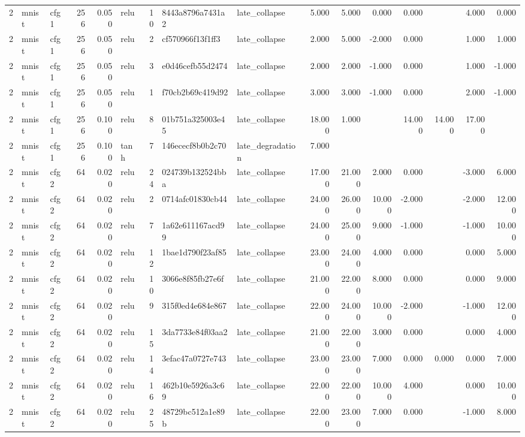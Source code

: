\begin{table}[htbp]
{\begin{tabular}{@{}rllrrlrllrrrrrrr@{}}
2 & mnist & cfg1 & 256 & 0.050 & relu & 10 & 8443a8796a7431a2 & late\_collapse & 5.000 & 5.000 & 0.000 & 0.000 &  & 4.000 & 0.000 \\
2 & mnist & cfg1 & 256 & 0.050 & relu & 2 & cf570966f13f1ff3 & late\_collapse & 2.000 & 5.000 & -2.000 & 0.000 &  & 1.000 & 1.000 \\
2 & mnist & cfg1 & 256 & 0.050 & relu & 3 & e0d46cefb55d2474 & late\_collapse & 2.000 & 2.000 & -1.000 & 0.000 &  & 1.000 & -1.000 \\
2 & mnist & cfg1 & 256 & 0.050 & relu & 1 & f70cb2b69c419d92 & late\_collapse & 3.000 & 3.000 & -1.000 & 0.000 &  & 2.000 & -1.000 \\
2 & mnist & cfg1 & 256 & 0.100 & relu & 8 & 01b751a325003e45 & late\_collapse & 18.000 & 1.000 &  & 14.000 & 14.000 & 17.000 &  \\
2 & mnist & cfg1 & 256 & 0.100 & tanh & 7 & 146ececf8b0b2c70 & late\_degradation & 7.000 &  &  &  &  &  &  \\
2 & mnist & cfg2 & 64 & 0.020 & relu & 24 & 024739b132524bba & late\_collapse & 17.000 & 21.000 & 2.000 & 0.000 &  & -3.000 & 6.000 \\
2 & mnist & cfg2 & 64 & 0.020 & relu & 2 & 0714afc01830cb44 & late\_collapse & 24.000 & 26.000 & 10.000 & -2.000 &  & -2.000 & 12.000 \\
2 & mnist & cfg2 & 64 & 0.020 & relu & 7 & 1a62e611167acd99 & late\_collapse & 24.000 & 25.000 & 9.000 & -1.000 &  & -1.000 & 10.000 \\
2 & mnist & cfg2 & 64 & 0.020 & relu & 12 & 1bae1d790f23af85 & late\_collapse & 23.000 & 24.000 & 4.000 & 0.000 &  & 0.000 & 5.000 \\
2 & mnist & cfg2 & 64 & 0.020 & relu & 10 & 3066e8f85fb27e6f & late\_collapse & 21.000 & 22.000 & 8.000 & 0.000 &  & 0.000 & 9.000 \\
2 & mnist & cfg2 & 64 & 0.020 & relu & 9 & 315f0ed4e684e867 & late\_collapse & 22.000 & 24.000 & 10.000 & -2.000 &  & -1.000 & 12.000 \\
2 & mnist & cfg2 & 64 & 0.020 & relu & 15 & 3da7733e84f03aa2 & late\_collapse & 21.000 & 22.000 & 3.000 & 0.000 &  & 0.000 & 4.000 \\
2 & mnist & cfg2 & 64 & 0.020 & relu & 14 & 3efac47a0727e743 & late\_collapse & 23.000 & 23.000 & 7.000 & 0.000 & 0.000 & 0.000 & 7.000 \\
2 & mnist & cfg2 & 64 & 0.020 & relu & 16 & 462b10e5926a3c69 & late\_collapse & 22.000 & 22.000 & 10.000 & 4.000 &  & 0.000 & 10.000 \\
2 & mnist & cfg2 & 64 & 0.020 & relu & 25 & 48729bc512a1e89b & late\_collapse & 22.000 & 23.000 & 7.000 & 0.000 &  & -1.000 & 8.000 \\

\end{tabular}}
\end{table}
